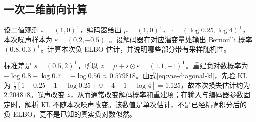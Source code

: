\documentclass[UTF8,12pt,a4paper,fontset=fandol]{ctexart}
\begin{document}
\subsection{一次二维前向计算}
\begin{example}[从编码器输出走到损失]
设二值观测 $x=(1,0)^\mathsf T$，编码器给出 $\mu=(1,0)^\mathsf T$、$v=(\log0.25,\log4)^\mathsf T$，本次噪声样本为 $\varepsilon=(0.2,-0.5)^\mathsf T$。设解码器在对应潜变量处输出 Bernoulli 概率 $(0.8,0.3)^\mathsf T$。计算本次负 ELBO 估计，并说明哪些部分带有采样随机性。
\end{example}
\begin{solve}
标准差是 $s=(0.5,2)^\mathsf T$，所以 $z=\mu+s\odot\varepsilon=(1.1,-1)^\mathsf T$。重建负对数概率为 $-\log0.8-\log0.7=-\log0.56\approx0.579818$。由式\eqref{eq:vae-diagonal-kl}，先验 KL 为 $\tfrac12[1+0.25-1-\log0.25+0+4-1-\log4]=1.625$，故本次损失估计约为 $2.204818$。噪声改变 $z$，从而通常改变解码概率和重建项；在输入与编码器参数固定时，解析 KL 不随本次噪声改变。该数值是单次估计，不是已经精确积分后的负 ELBO，更不是已知的真实负对数似然。
\end{solve}
\end{document}
